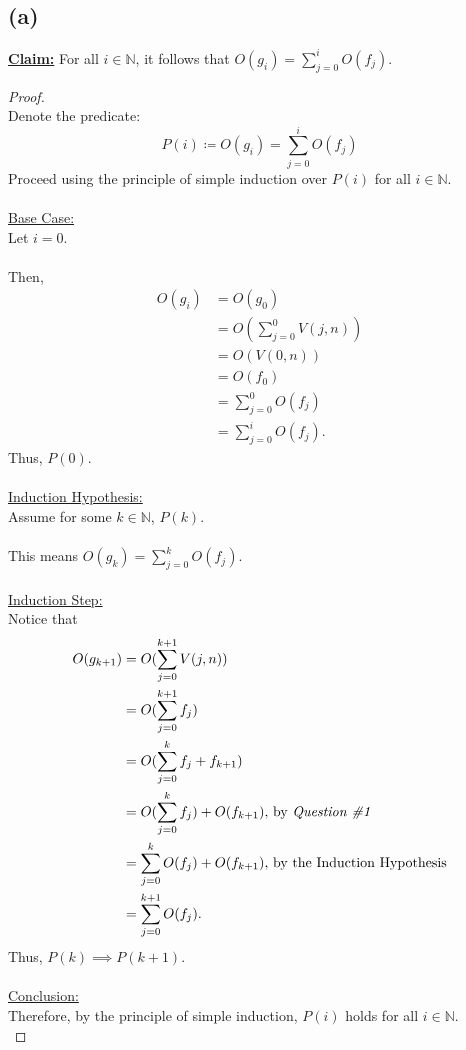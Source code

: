\documentclass[12pt]{article}
\begin{document}
\subsection*{(a)}
\textbf{\underline{Claim:}} For all \( i \in \mathbb{N} \), it follows that \( O(g_i) = \sum_{j=0}^{i} O(f_j) \).
\begin{proof}
\leavevmode\\
    Denote the predicate:
    \[
        P(i) \coloneq O(g_i) = \sum_{j=0}^{i} O(f_j)
    \]
    Proceed using the principle of simple induction over \( P(i) \) for all \( i \in \mathbb{N} \). \\
    \\
    \underline{Base Case:} \\
    Let \( i = 0 \). \\
    \\
    Then,
    \begin{equation*}
        \begin{aligned}
            O(g_i) &= O(g_0) \\
            &= O(\sum_{j=0}^{0} V(j, n)) \\
            &= O(V(0, n)) \\
            &= O(f_0) \\
            &= \sum_{j=0}^{0} O(f_j) \\
            &= \sum_{j=0}^{i} O(f_j) \text{.}
        \end{aligned}
    \end{equation*}
    Thus, \( P(0) \). \\
    \\
    \underline{Induction Hypothesis:} \\
    Assume for some \( k \in \mathbb{N} \), \( P(k) \). \\
    \\
    This means \( O(g_k) = \sum_{j=0}^{k} O(f_j) \). \\
    \\
    \underline{Induction Step:} \\
    Notice that
    \begin{equation*}
        \begin{aligned}
            O(g_{k + 1}) &= O(\sum_{j=0}^{k + 1} V(j, n)) \\
            &= O(\sum_{j=0}^{k + 1} f_j) \\
            &= O(\sum_{j=0}^{k} f_j + f_{k + 1}) \\
            &= O(\sum_{j=0}^{k} f_j) + O(f_{k + 1}) \text{, by \textit{Question \#1}} \\
            &= \sum_{j=0}^{k} O(f_j) + O(f_{k + 1}) \text{, by the Induction Hypothesis} \\
            &= \sum_{j=0}^{k + 1} O(f_j) \text{.}
        \end{aligned}
    \end{equation*}
    Thus, \( P(k) \implies P(k + 1) \). \\
    \\
    \underline{Conclusion:} \\
    Therefore, by the principle of simple induction, \( P(i) \) holds for all \( i \in \mathbb{N} \). \\
\end{proof}
\end{document}
